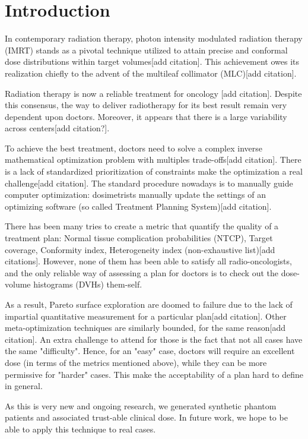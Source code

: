 \section{Introduction}
In contemporary radiation therapy, photon intensity modulated radiation therapy (IMRT) stands as a pivotal technique utilized to attain precise and conformal dose distributions within target volumes[add citation].
This achievement owes its realization chiefly to the advent of the multileaf collimator (MLC)[add citation].

Radiation therapy is now a reliable treatment for oncology [add citation].
Despite this consensus, the way to deliver radiotherapy for its best result remain very dependent upon doctors.
Moreover, it appears that there is a large variability across centers[add citation?].

To achieve the best treatment, doctors need to solve a complex inverse mathematical optimization problem with multiples trade-offs[add citation].
There is a lack of standardized prioritization of constraints make the optimization a real challenge[add citation].
The standard procedure nowadays is to manually guide computer optimization: dosimetrists manually update the settings of an optimizing software (so called Treatment Planning System)[add citation].

There has been many tries to create a metric that quantify the quality of a treatment plan: Normal tissue complication probabilities (NTCP), Target coverage, Conformity index, Heterogeneity index (non-exhaustive list)[add citations].
However, none of them has been able to satisfy all radio-oncologists, and the only reliable way of assessing a plan for doctors is to check out the dose-volume histograms (DVHs) them-self.

As a result, Pareto surface exploration are doomed to failure due to the lack of impartial quantitative measurement for a particular plan[add citation].
Other meta-optimization techniques are similarly bounded, for the same reason[add citation].
An extra challenge to attend for those is the fact that not all cases have the same "difficulty".
Hence, for an "easy" case, doctors will require an excellent dose (in terms of the metrics mentioned above), while they can be more permissive for "harder" cases.
This make the acceptability of a plan hard to define in general.

As this is very new and ongoing research, we generated synthetic phantom patients and associated trust-able clinical dose.
In future work, we hope to be able to apply this technique to real cases.

